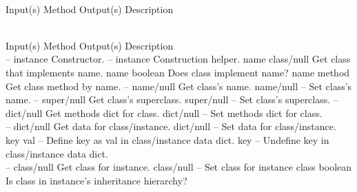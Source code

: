 \begin{longtable}{}
\caption{gcdict summary}
\\
\hline
\optableent
	{Input(s)}
	{Method}
	{Output(s)}
	{Description}
\hline \hline
\endfirsthead
\caption[]{\emph{continued}} \\
\hline
\optableent
	{Input(s)}
	{Method}
	{Output(s)}
	{Description}
\hline \hline \endhead
{} \endfoot
\hline \endlastfoot
 \\
\hline \hline
\optableent
	{--}
	{{\bf {}}}
	{instance}
	{Constructor.}
\hline
\optableent
	{--}
	{{\bf {}}}
	{instance}
	{Construction helper.}
\hline
\optableent
	{name}
	{{\bf {}}}
	{class/null}
	{Get class that implements name.}
\hline
\optableent
	{name}
	{{\bf {}}}
	{boolean}
	{Does class implement name?}
\hline
\optableent
	{name}
	{{\bf {}}}
	{method}
	{Get class method by name.}
\hline
\optableent
	{--}
	{{\bf {}}}
	{name/null}
	{Get class's name.}
\hline
\optableent
	{name/null}
	{{\bf {}}}
	{--}
	{Set class's name.}
\hline
\optableent
	{--}
	{{\bf {}}}
	{super/null}
	{Get class's superclass.}
\hline
\optableent
	{super/null}
	{{\bf {}}}
	{--}
	{Set class's superclass.}
\hline
\optableent
	{--}
	{{\bf {}}}
	{dict/null}
	{Get methods dict for class.}
\hline
\optableent
	{dict/null}
	{{\bf {}}}
	{--}
	{Set methods dict for class.}
\hline \hline
{} \\
\hline \hline
\optableent
	{--}
	{{\bf {}}}
	{dict/null}
	{Get data for class/instance.}
\hline
\optableent
	{dict/null}
	{{\bf {}}}
	{--}
	{Set data for class/instance.}
\hline
\optableent
	{key val}
	{{\bf {}}}
	{--}
	{Define key as val in class/instance data dict.}
\hline
\optableent
	{key}
	{{\bf {}}}
	{--}
	{Undefine key in class/instance data dict.}
\hline \hline
{} \\
\hline \hline
\optableent
	{--}
	{{\bf {}}}
	{class/null}
	{Get class for instance.}
\hline
\optableent
	{class/null}
	{{\bf {}}}
	{--}
	{Set class for instance}
\hline
\optableent
	{class}
	{{\bf {}}}
	{boolean}
	{Is class in instance's inheritance hierarchy?}
\end{longtable}

